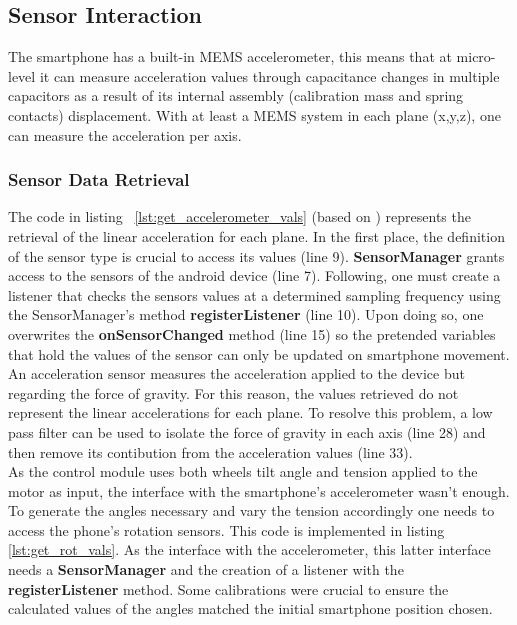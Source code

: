 \subsection{Sensor Interaction}%
\label{sec:accelerometer-access}
%
The smartphone has a built-in MEMS accelerometer, this means that at micro-level it can measure acceleration values through capacitance changes in multiple capacitors as a result of its internal assembly (calibration mass and spring contacts) displacement. With at least a MEMS system in each plane (x,y,z), one can measure the acceleration per axis. 
\subsubsection{Sensor Data Retrieval}
\label{sec:accelerometer-data}
%
The code in listing ~\ref{lst:get_accelerometer_vals} (based on \cite{androiddevsensors}) represents the retrieval of the linear acceleration for each plane.
In the first place, the definition of the sensor type is crucial to access its values (line 9). \textbf{SensorManager} grants access to the sensors of the android device (line 7). Following, one must create a listener that checks the sensors values at a determined sampling frequency using the SensorManager's method \textbf{registerListener} (line 10). Upon doing so, one overwrites the \textbf{onSensorChanged} method (line 15) so the pretended variables that hold the values of the sensor can only be updated on smartphone movement.
An acceleration sensor measures the acceleration applied to the device but regarding the force of gravity. For this reason, the values retrieved do not represent the linear accelerations for each plane. To resolve this problem, a low pass filter can be used to isolate the force of gravity in each axis (line 28) and then remove its contibution from the acceleration values (line 33).\\
%

%
As the control module uses both wheels tilt angle and tension applied to the motor as input, the interface with the smartphone's accelerometer wasn't enough. To generate the angles necessary and vary the tension accordingly one needs to access the phone's rotation sensors. This code is implemented in listing \ref{lst:get_rot_vals}. As the interface with the accelerometer, this latter interface needs a \textbf{SensorManager} and the creation of a listener with the \textbf{registerListener} method. Some calibrations were crucial to ensure the calculated values of the angles matched the initial smartphone position chosen.\\
%

%
